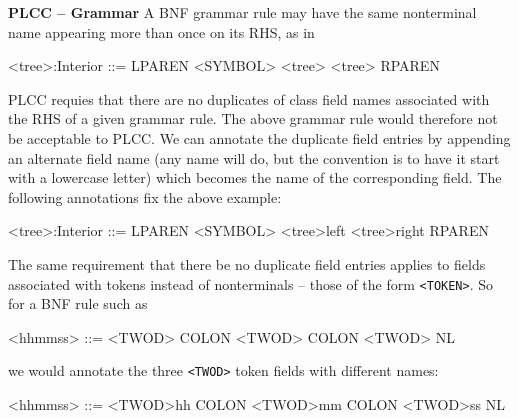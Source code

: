 \begin{minipage}[t]{\sw}
\slidenumber
\LARGE
{\bf PLCC -- Grammar}\exx
A BNF grammar rule may have the same nonterminal name appearing
more than once on its RHS, as in
{\Large
\begin{qv}
<tree>:Interior ::= LPAREN <SYMBOL> <tree> <tree> RPAREN
\end{qv}
}
PLCC requies that there are no duplicates of class field names
associated with the RHS of a given grammar rule.
The above grammar rule would therefore not be acceptable to PLCC.
We can annotate the duplicate field entries
by appending an alternate field name
(any name will do, but the convention is to have it start
with a lowercase letter)
which becomes the name of the corresponding field.
The following annotations fix the above example:
{\Large
\begin{qv}
<tree>:Interior ::= LPAREN <SYMBOL> <tree>left <tree>right RPAREN
\end{qv}
}
The same requirement that there be no duplicate field entries
applies to fields associated with tokens instead of nonterminals --
those of the form \verb'<TOKEN>'. So for a BNF rule such as
{\Large
\begin{qv}
<hhmmss> ::= <TWOD> COLON <TWOD> COLON <TWOD> NL
\end{qv}
}
we would annotate the three \verb'<TWOD>' token fields with different names:
{\Large
\begin{qv}
<hhmmss> ::= <TWOD>hh COLON <TWOD>mm COLON <TWOD>ss NL
\end{qv}
}
\end{minipage}
\clearpage
